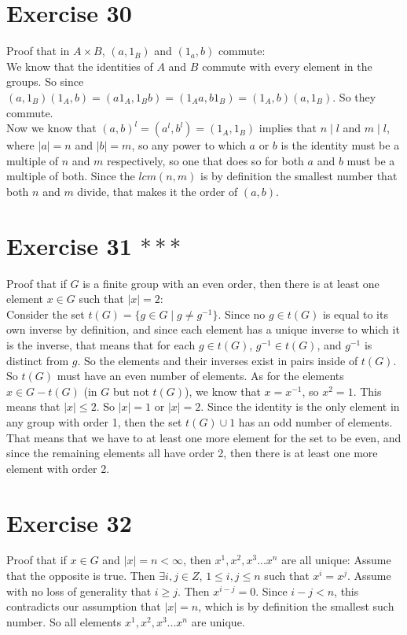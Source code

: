 \documentclass[12pt]{article}
\begin{document}
    \section*{Exercise 30}
    Proof that in $A \times B$, $(a, 1_B)$ and $(1_a, b)$ commute: \\
    We know that the identities of $A$ and $B$ commute with every element
    in the groups.
    So since $(a, 1_B)(1_A, b)
    = (a1_A, 1_Bb)
    = (1_Aa, b1_B)
    = (1_A, b)(a, 1_B)$.
    So they commute. \\
    Now we know that $(a, b)^l = (a^l, b^l) = (1_A, 1_B)$
    implies that $n \mid l$ and $m \mid l$,
    where $|a| = n$ and $|b| = m$,
    so any power to which $a$ or $b$ is the identity must be
    a multiple of $n$ and $m$ respectively,
    so one that does so for both $a$ and $b$ must be a multiple of both.
    Since the $lcm(n, m)$ is by definition the smallest number that both
    $n$ and $m$ divide, that makes it the order of $(a, b)$. 

    \section*{Exercise 31 $***$}
    Proof that if $G$ is a finite group with an even order,
    then there is at least one element $x \in G$ such that $|x| = 2$: \\
    Consider the set $t(G) = \{g \in G \mid g \neq g^{-1}\}$.
    Since no $g \in t(G)$ is equal to its own inverse by definition,
    and since each element has a unique inverse to which it is the inverse,
    that means that for each $g \in t(G)$,
    $g^{-1} \in t(G)$, and $g^{-1}$ is distinct from $g$.
    So the elements and their inverses exist in pairs inside of $t(G)$.
    So $t(G)$ must have an even number of elements.
    As for the elements $x \in G - t(G)$ (in $G$ but not $t(G)$),
    we know that $x = x^{-1}$,
    so $x^2 = 1$.
    This means that $|x| \leqslant 2$.
    So $|x| = 1$ or $|x| = 2$.
    Since the identity is the only element in any group with order 1, 
    then the set $t(G) \cup {1}$ has an odd number of elements.
    That means that we have to at least one more element for the set to be
    even, and since the remaining elements all have order 2, then there is
    at least one more element with order 2.


    \section*{Exercise 32}
    Proof that if $x \in G$ and $|x| = n < \infty$,
    then $x^1, x^2, x^3 ... x^n$ are all unique:
    Assume that the opposite is true.
    Then $\exists i, j \in Z$, $1 \leqslant i, j \leqslant n$
    such that $x^i = x^j$.
    Assume with no loss of generality that $i \geqslant j$.
    Then $x^{i - j} = 0$.
    Since $i - j < n$, this contradicts our assumption that $|x| = n$,
    which is by definition the smallest such number.
    So all elements $x^1, x^2, x^3 ... x^n$ are unique. 
\end{document}
